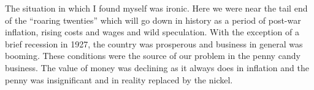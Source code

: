 \documentclass[12pt]{book}              %
\begin{document}
The situation in which I found myself was ironic. Here we were near the tail end of the ``roaring twenties'' which will go down in history as a period of post-war inflation, rising costs and wages and wild speculation. With the exception of a brief recession in 1927, the country was prosperous and business in general was booming. These conditions were the source of our problem in the penny candy business. The value of money was declining as it always does in inflation and the penny was insignificant and in reality replaced by the nickel.
\end{document}

